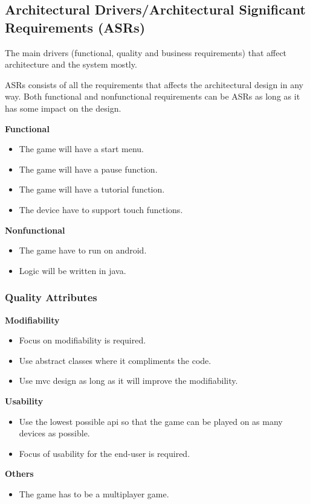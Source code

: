 \subsection{Architectural Drivers/Architectural Significant Requirements (ASRs)}
The main drivers (functional, quality and business requirements) that affect architecture and the system mostly.

ASRs consists of all the requirements that affects the architectural design in any way. Both functional and nonfunctional requirements can be ASRs as long as it has some impact on the design.

\textbf{Functional}
\begin{itemize}
	\item The game will have a start menu.
	\item The game will have a pause function.
	\item The game will have a tutorial function.
	\item The device have to support touch functions.
\end{itemize}

\textbf{Nonfunctional}
\begin{itemize}
	\item The game have to run on android.
	\item Logic will be written in java.
\end{itemize}

\subsubsection{Quality Attributes}

\textbf{Modifiability}
\begin{itemize}
	\item Focus on modifiability is required.
	\item Use abstract classes where it compliments the code.
	\item Use mvc design as long as it will improve the modifiability.
\end{itemize}

\textbf{Usability}
\begin{itemize}
	\item Use the lowest possible api so that the game can be played on as many devices as possible.
	\item Focus of usability for the end-user is required.
\end{itemize}

\textbf{Others}
\begin{itemize}
	\item The game has to be a multiplayer game.
\end{itemize}
